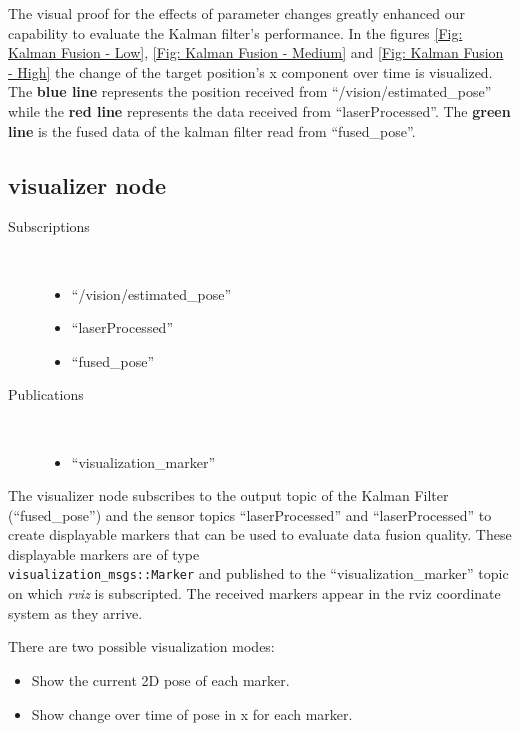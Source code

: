 The visual proof for the effects of parameter changes greatly enhanced our capability to evaluate the Kalman filter's performance. In the figures \ref{Fig: Kalman Fusion - Low}, \ref{Fig: Kalman Fusion - Medium} and \ref{Fig: Kalman Fusion - High} the change of the target position's x component over time is visualized. The \textbf{blue line} represents the position received from ``/vision/estimated\_pose'' while the \textbf{red line} represents the data received from ``laserProcessed''. The \textbf{green line} is the fused data of the kalman filter read from ``fused\_pose''.

\subsection{visualizer node}
\begin{description}
\item[Subscriptions]\
	\begin{itemize}
	\item ``/vision/estimated\_pose'' 
	\item ``laserProcessed''
	\item ``fused\_pose''
	\end{itemize}
	
\item[Publications]\
	\begin{itemize}
	\item ``visualization\_marker''
	\end{itemize}
\end{description}

The visualizer node subscribes to the output topic of the Kalman Filter (``fused\_pose'') and the sensor topics ``laserProcessed'' and ``laserProcessed'' to create displayable markers that can be used to evaluate data fusion quality. These displayable markers are of type \\ \texttt{visualization\_msgs::Marker} and published to the ``visualization\_marker'' topic on which \textit{rviz} is subscripted. The received markers appear in the rviz coordinate system as they arrive.

There are two possible visualization modes:

\begin{itemize}
\item Show the current 2D pose of each marker.
\item Show change over time of pose in x for each marker.
\end{itemize}

